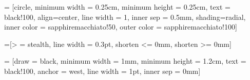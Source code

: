  = [circle, 
					   minimum width = 0.25cm, 
					   minimum height = 0.25cm, 
					   text = black!100, 
					   align=center, 
					   line width = 1, 
					   inner sep = 0.5mm, 
					   shading=radial, 
					   inner color = sapphiremacchiato!50, 
					   outer color = sapphiremacchiato!100]

=[> = stealth, line width = 0.3pt, shorten <= 0mm, shorten >= 0mm]


\newcommand{\slotheight}{1.2cm}
\newcommand{\slotwidth}{1mm}
\newcommand{\numchannels}{10}
\newcommand{\fsperchannel}{5}
\newcommand{\lw}{1pt}

 = [draw = black,
					minimum width = \slotwidth, 
				    minimum height = \slotheight, 
					text = black!100, 
					anchor = west, 
					line width = \lw,
					inner sep = 0mm]
    

